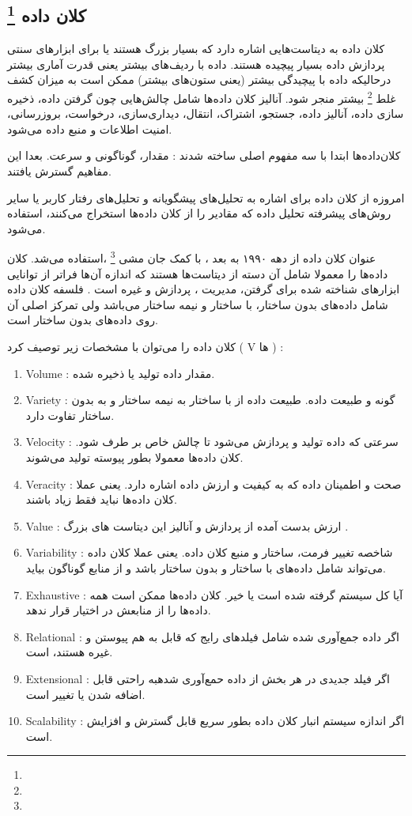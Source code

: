 \documentclass[a4paper, 12pt]{article}
\begin{document}
   \subsection*{کلان داده
\footnote{}   
}

   کلان داده به دیتاست‌هایی اشاره دارد که بسیار بزرگ هستند یا برای ابزار‌های سنتی پردازش داده بسیار پیچیده هستند. داده‌ با ردیف‌های بیشتر یعنی قدرت آماری بیشتر درحالیکه داده با پیچیدگی بیشتر (یعنی ستون‌های بیشتر) ممکن است به میزان کشف غلط 
   \footnote{}
   بیشتر منجر شود. آنالیز کلان داده‌ها شامل چالش‌هایی چون گرفتن داده، ذخیره سازی داده، آنالیز داده، جستجو، اشتراک، انتقال، دیداری‌سازی، درخواست، بروزرسانی، امنیت اطلاعات و منبع داده می‌شود. 
   
   کلان‌داده‌ها ابتدا با سه مفهوم اصلی ساخته شدند : مقدار، گوناگونی و سرعت. بعدا این مفاهیم گسترش یافتند. 
   
   امروزه از کلان داده برای اشاره به تحلیل‌های پیشگویانه و تحلیل‌های رفتار کاربر یا سایر روش‌های پیشرفته تحلیل‌ داده که مقادیر را از کلان داده‌ها استخراج می‌کنند، استفاده می‌شود. 
   
   عنوان کلان داده از دهه ۱۹۹۰ به بعد ، با کمک جان مشی 
   \footnote{}
   ،استفاده می‌شد. کلان داده‌ها را معمولا شامل آن دسته از دیتاست‌ها هستند که اندازه آن‌ها فراتر از توانایی ابزار‌های شناخته شده برای گرفتن، مدیریت ، پردازش و غیره است .   فلسفه کلان داده شامل داده‌های بدون ساختار، با ساختار و نیمه ساختار می‌باشد ولی تمرکز اصلی آن روی داده‌های بدون ساختار است. 
   
   کلان داده را می‌توان با مشخصات زیر توصیف کرد ( V ها ) :
   \begin{enumerate}
   	\item 
   	Volume 
   	: 
   	مقدار داده تولید یا ذخیره شده. 
   	\item
   	Variety
   	:
   	گونه و طبیعت داده. طبیعت داده از با ساختار به نیمه ساختار و به بدون ساختار تفاوت دارد. 
   	\item
   	Velocity 
   	:
   سرعتی که داده تولید و پردازش می‌شود تا چالش خاص بر طرف شود. کلان داده‌ها معمولا بطور پیوسته تولید می‌شوند.
   \item
   Veracity :
   صحت و اطمینان داده که به کیفیت و ارزش داده اشاره دارد. یعنی عملا کلان داده‌ها نباید فقط زیاد باشند.
   \item
   Value 
   :
   ارزش بدست آمده از پردازش و آنالیز این دیتاست ‌های بزرگ . 
   \item
   Variability 
   :
   شاخصه تغییر فرمت، ساختار و منبع  کلان داده‌. یعنی عملا کلان داده‌ می‌تواند شامل داده‌های با ساختار و بدون ساختار باشد و از منابع گوناگون بیاید.
   \item
   Exhaustive
   :
   آیا کل سیستم 
   گرفته شده است یا خیر. کلان داده‌ها ممکن است همه داده‌ها را از منابعش در اختیار قرار ندهد.
   \item
   Relational
   :
   اگر داده جمع‌آوری شده شامل فیلد‌های رایج که قابل به هم پیوستن و غیره هستند، است.
   \item
   Extensional
   :
   اگر فیلد جدیدی در هر بخش از داده حمع‌آوری شدهبه راحتی  قابل اضافه شدن یا تغییر است.
   \item
   Scalability
   :
   اگر اندازه سیستم انبار کلان داده بطور سریع قابل گسترش و افزایش است. 
   \end{enumerate}  
   
\end{document}
